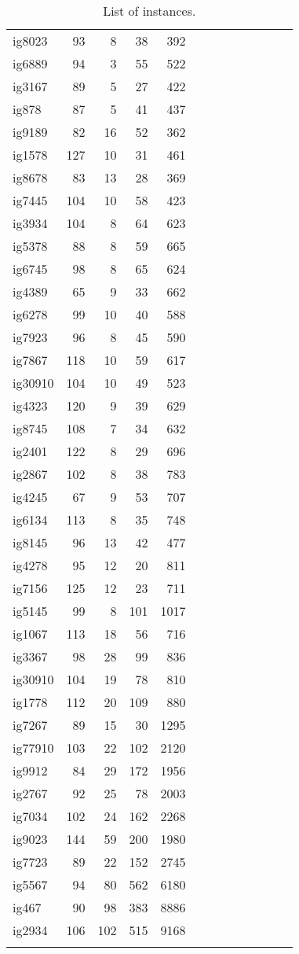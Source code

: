 \begin{longtable}{lrrrrrrrrrrrr}
ig8023 & 93 & 8 & 38 & 392 \\
ig6889 & 94 & 3 & 55 & 522 \\
ig3167 & 89 & 5 & 27 & 422 \\
ig878 & 87 & 5 & 41 & 437 \\
ig9189 & 82 & 16 & 52 & 362 \\
ig1578 & 127 & 10 & 31 & 461 \\
ig8678 & 83 & 13 & 28 & 369 \\
ig7445 & 104 & 10 & 58 & 423 \\
ig3934 & 104 & 8 & 64 & 623 \\
ig5378 & 88 & 8 & 59 & 665 \\
ig6745 & 98 & 8 & 65 & 624 \\
ig4389 & 65 & 9 & 33 & 662 \\
ig6278 & 99 & 10 & 40 & 588 \\
ig7923 & 96 & 8 & 45 & 590 \\
ig7867 & 118 & 10 & 59 & 617 \\
ig30910 & 104 & 10 & 49 & 523 \\
ig4323 & 120 & 9 & 39 & 629 \\
ig8745 & 108 & 7 & 34 & 632 \\
ig2401 & 122 & 8 & 29 & 696 \\
ig2867 & 102 & 8 & 38 & 783 \\
ig4245 & 67 & 9 & 53 & 707 \\
ig6134 & 113 & 8 & 35 & 748 \\
ig8145 & 96 & 13 & 42 & 477 \\
ig4278 & 95 & 12 & 20 & 811 \\
ig7156 & 125 & 12 & 23 & 711 \\
ig5145 & 99 & 8 & 101 & 1017 \\
ig1067 & 113 & 18 & 56 & 716 \\
ig3367 & 98 & 28 & 99 & 836 \\
ig30910 & 104 & 19 & 78 & 810 \\
ig1778 & 112 & 20 & 109 & 880 \\
ig7267 & 89 & 15 & 30 & 1295 \\
ig77910 & 103 & 22 & 102 & 2120 \\
ig9912 & 84 & 29 & 172 & 1956 \\
ig2767 & 92 & 25 & 78 & 2003 \\
ig7034 & 102 & 24 & 162 & 2268 \\
ig9023 & 144 & 59 & 200 & 1980 \\
ig7723 & 89 & 22 & 152 & 2745 \\
ig5567 & 94 & 80 & 562 & 6180 \\
ig467 & 90 & 98 & 383 & 8886 \\
ig2934 & 106 & 102 & 515 & 9168 \\

\caption{List of instances.}
\end{longtable}